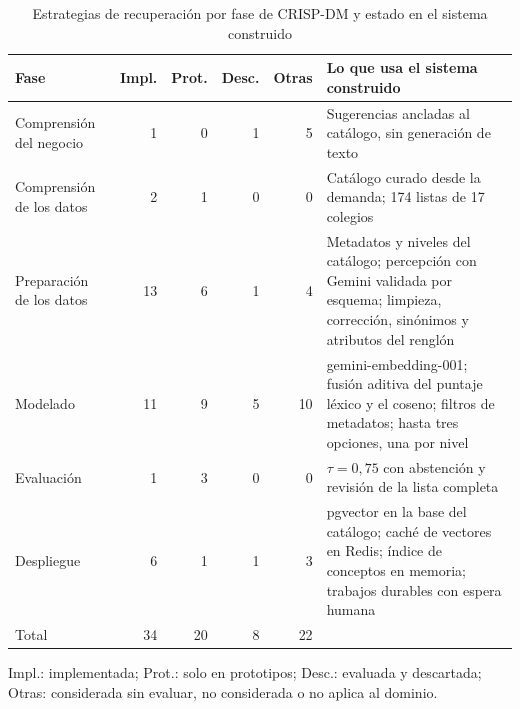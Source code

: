 \begin{table}[htbp]
\centering
\caption{Estrategias de recuperación por fase de CRISP-DM y estado en el sistema construido}
\label{tab:rag-fases}
\footnotesize
\begin{tabular}{@{}lrrrrp{6.2cm}@{}}
\toprule
\textbf{Fase} & \textbf{Impl.} & \textbf{Prot.} & \textbf{Desc.} & \textbf{Otras} & \textbf{Lo que usa el sistema construido} \\
\midrule
Comprensión del negocio & 1 & 0 & 1 & 5 & Sugerencias ancladas al catálogo, sin generación de texto \\
Comprensión de los datos & 2 & 1 & 0 & 0 & Catálogo curado desde la demanda; 174 listas de 17 colegios \\
Preparación de los datos & 13 & 6 & 1 & 4 & Metadatos y niveles del catálogo; percepción con Gemini validada por esquema; limpieza, corrección, sinónimos y atributos del renglón \\
Modelado & 11 & 9 & 5 & 10 & gemini-embedding-001; fusión aditiva del puntaje léxico y el coseno; filtros de metadatos; hasta tres opciones, una por nivel \\
Evaluación & 1 & 3 & 0 & 0 & $\tau=0{,}75$ con abstención y revisión de la lista completa \\
Despliegue & 6 & 1 & 1 & 3 & pgvector en la base del catálogo; caché de vectores en Redis; índice de conceptos en memoria; trabajos durables con espera humana \\
\midrule
Total & 34 & 20 & 8 & 22 & \\
\bottomrule
\end{tabular}
\par\smallskip
{\footnotesize Impl.: implementada; Prot.: solo en prototipos; Desc.: evaluada y descartada; Otras: considerada sin evaluar, no considerada o no aplica al dominio.}
\end{table}
